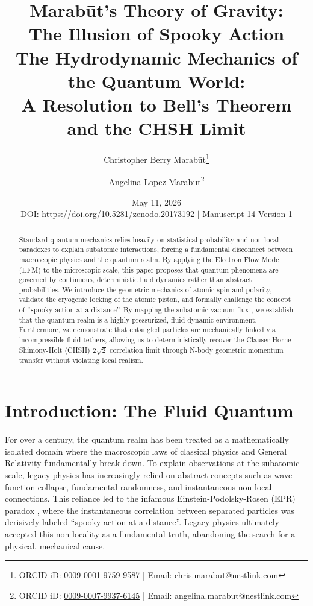 \documentclass[11pt, a4paper]{article}
\title{\textbf{Marab\={u}t's Theory of Gravity: \\ The Illusion of Spooky Action} \\[1em] \large{The Hydrodynamic Mechanics of the Quantum World: \\ A Resolution to Bell's Theorem and the CHSH Limit}}
\author[1]{Christopher Berry Marab\={u}t\thanks{ORCID iD: \href{https://orcid.org/0009-0001-9759-9587}{0009-0001-9759-9587} | Email: chris.marabut@nestlink.com}}
\author[1]{Angelina Lopez Marab\={u}t\thanks{ORCID iD: \href{https://orcid.org/0009-0007-9937-6145}{0009-0007-9937-6145} | Email: angelina.marabut@nestlink.com}}
\affil[1]{Independent Researchers}
\date{May 11, 2026 \\[1.5em] \small{DOI: \url{https://doi.org/10.5281/zenodo.20173192} $|$ Manuscript 14 Version 1}}
\begin{document}

\maketitle

\begin{abstract}
  Standard quantum mechanics relies heavily on statistical probability and non-local paradoxes to explain subatomic interactions, forcing a fundamental disconnect between macroscopic physics and the quantum realm. By applying the Electron Flow Model (EFM) to the microscopic scale, this paper proposes that quantum phenomena are governed by continuous, deterministic fluid dynamics rather than abstract probabilities. We introduce the geometric mechanics of atomic spin and polarity, validate the cryogenic locking of the atomic piston, and formally challenge the concept of ``spooky action at a distance''. By mapping the subatomic vacuum flux \cite{marabut2026m5}, we establish that the quantum realm is a highly pressurized, fluid-dynamic environment. Furthermore, we demonstrate that entangled particles are mechanically linked via incompressible fluid tethers, allowing us to deterministically recover the Clauser-Horne-Shimony-Holt (CHSH) $2\sqrt{2}$ correlation limit through N-body geometric momentum transfer without violating local realism.
\end{abstract}

\section{Introduction: The Fluid Quantum}
  For over a century, the quantum realm has been treated as a mathematically isolated domain where the macroscopic laws of classical physics and General Relativity fundamentally break down. To explain observations at the subatomic scale, legacy physics has increasingly relied on abstract concepts such as wave-function collapse, fundamental randomness, and instantaneous non-local connections. This reliance led to the infamous Einstein-Podolsky-Rosen (EPR) paradox \cite{epr1935}, where the instantaneous correlation between separated particles was derisively labeled ``spooky action at a distance''. Legacy physics ultimately accepted this non-locality as a fundamental truth, abandoning the search for a physical, mechanical cause.
  
\end{document}
